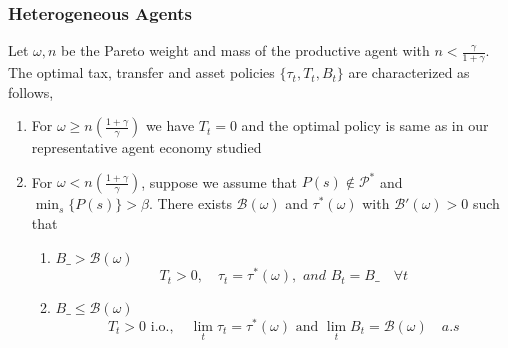 \documentclass{beamer}
\begin{document}
\begin{frame}
\frametitle{Heterogeneous Agents}
\small
\begin{theorem}
\label{thm heterogeneous agents}
Let $\omega,n$ be the Pareto weight and mass of the productive agent with $n<\frac{\gamma}{1+\gamma}$. The optimal tax, transfer and asset policies $\{\tau_t,T_t,B_t\}$ are characterized as follows,


\begin{enumerate}
 \item For $\omega\geq n \left(\frac{1+\gamma}{\gamma}\right)$ we have  $T_t=0$ and the optimal policy is same as in our representative agent economy studied 

\item For $\omega< n \left(\frac{1+\gamma}{\gamma}\right)$, suppose we assume that  $P(s)\not \in \mathcal{P}^*$ and $\min_{s}\{P(s)\}>\beta$. There exists $\mathcal{B}(\omega)$ and $\tau^*(\omega)$ with $\mathcal{B}'(\omega)>0$ such that 

\begin{enumerate}
  \item $B\_>\mathcal{B(\omega)}$
\[T_t>0, \quad \tau_t=\tau^*(\omega), \textit{ and } B_t=B\_ \quad \forall t\] 
\item $B\_\leq \mathcal{B(\omega)}$ 
   \[T_t>0 \text{ i.o.},\quad \lim_t\tau_t=\tau^*(\omega) \text{ and } \lim_tB_t=\mathcal{B}(\omega)\quad \textit{a.s}\]
 \end{enumerate}

 \end{enumerate}

\end{theorem}

\end{frame}
\end{document}
